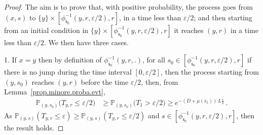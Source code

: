 \documentclass[10pt]{amsart}
\theoremstyle{definition}\newtheorem{defi}[theo]{Definition}\newtheorem{rema}[theo]{Remark}\newtheorem{exam}[theo]{Example}\newtheorem{exem}[theo]{Example}\newtheorem{nota}[theo]{Notation}
\newcommand{\PP}{\mathbb{P}}
\newcommand{\barmu}{\mu(\bar s_1)}
\newcommand{\phis}{\phi_{\textsf{s}_0}^{-1}}
\newcommand{\1}{\mathbf{1}}
\begin{document}
\begin{proof}
The aim is to prove that, with positive probability, the process goes from $(x,s)$ to $\{y\}\times [\phis(y,r,\varepsilon/2), r]$, in a time less than $\varepsilon/2$; and then starting from an initial condition in $\{y\}\times [\phis(y,r,\varepsilon/2), r]$ it reaches $(y,r)$ in a time less than $\varepsilon/2$. We then have three cases.

1. If $x=y$ then by definition of $\phis(y,r,.)$, for all $s_0 \in [\phis(y,r, \varepsilon/2), r]$ if there is no jump during the time interval $[0,\varepsilon/2]$, then the process starting from $(y,s_0)$ reaches $(y,r)$ before the time $\varepsilon/2$, then, from Lemma~\ref{prop.minore.proba.evt},
\begin{align}\label{eq.reach.Tys.fromSandy}
\PP_{\left(y,s_0\right)}
\Big(T_{y,r} \leq \varepsilon/2 \Big) &\geq
\PP_{(y,s_0)}
\Big(T_1>\varepsilon/2\Big)
\geq
e^{-(D+\barmu)\,L\frac{\varepsilon}{2}}\,.
\end{align}
As $\PP_{(y,s)}
(T_{y,r} \leq \varepsilon ) \geq \PP_{(y,s)}
(T_{y,r} \leq \varepsilon/2 )$ and $s \in [\phis(y,r, \varepsilon/2),r]$, then the result holds.



\end{proof}
\end{document}
